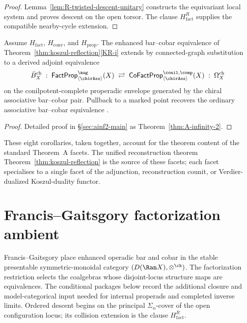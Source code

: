 \begin{proof}
Lemma~\ref{lem:R-twisted-descent-unitary} constructs the equivariant
local system and proves descent on the open torsor.  The clause
$H_{\mathrm{fact}}^{R}$ supplies the compatible nearby-cycle
extension.
\end{proof}

\begin{corollary}
\label{cor:eight-cor-properad-equiv}
Assume $H_{\mathrm{fact}}$, $H_{\mathrm{conv}}$, and
$H_{\mathrm{prop}}$.  The enhanced bar--cobar equivalence of
Theorem~\ref{thm:koszul-reflection}\ref{KR-i} extends by
connected-graph substitution to a derived adjoint equivalence
\[
\Bbarch_X\;:\;\FactProp^{\aug}_{\langle\chirAss\rangle}(X)
\;\rightleftarrows\;
\CoFactProp^{\conil,\comp}_{\langle\chirAss\rangle}(X)
\;:\;\Omegach_X
\]
on the conilpotent-complete properadic envelope generated by the
chiral associative bar--cobar pair.  Pullback to a marked point
recovers the ordinary associative bar--cobar equivalence
\cite[Corollary~2.3.4]{LV12}.
\end{corollary}

\begin{proof}
Detailed proof in \S\ref{sec:ainf2-main} as
Theorem~\ref{thm:A-infinity-2}.
\end{proof}

These eight corollaries, taken together, account for the theorem content
of the standard Theorem~A facets. The unified reconstruction theorem
Theorem~\ref{thm:koszul-reflection} is the source of these facets;
each facet specialises to a
single facet of the adjunction, reconstruction counit, or
Verdier-dualized Koszul-duality functor.

\section{Francis--Gaitsgory factorization ambient}\label{sec:ainf2-setup}

Francis--Gaitsgory place enhanced operadic bar and cobar in the stable
presentable symmetric-monoidal category
$(D(\Ran X),\otimes^{\ch})$.  The factorization restriction selects
the coalgebras whose disjoint-locus structure maps are equivalences.
The conditional packages below record the additional closure and
model-categorical input needed for internal properads and completed
inverse limits.  Ordered descent begins on the principal
$\Sigma_n$-cover of the open configuration locus; its collision
extension is the clause $H_{\mathrm{fact}}^{R}$.

